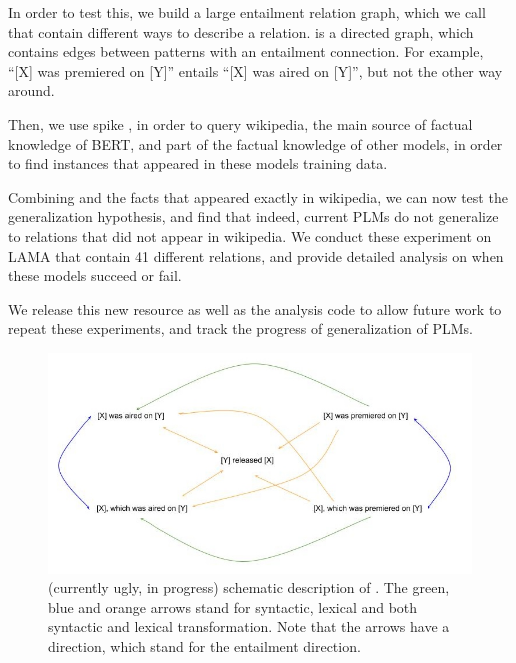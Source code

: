 In order to test this, we build a large entailment relation graph, which we call \resource{} that contain different ways to describe a relation. \resource{} is a directed graph, which contains edges between patterns with an entailment connection. For example, ``[X] was premiered on [Y]'' entails ``[X] was aired on [Y]'', but not the other way around.

Then, we use spike \cite{spike}, in order to query wikipedia, the main source of factual knowledge of BERT, and part of the factual knowledge of other models, in order to find instances that appeared in these models training data.

Combining \resource{} and the facts that appeared exactly in wikipedia, we can now test the generalization hypothesis, and find that indeed, current PLMs do not generalize to relations that did not appear in wikipedia.
We conduct these experiment on LAMA \cite{lama} that contain 41 different relations, and provide detailed analysis on when these models succeed or fail.

We release this new resource as well as the analysis code to allow future work to repeat these experiments, and track the progress of generalization of PLMs.

\begin{figure}[t!]
\centering

\includegraphics[width=1.\columnwidth]{figures/memorization-entailment-graph-croped}

\caption{(currently ugly, in progress) schematic description of \resource{}. The green, blue and orange arrows stand for syntactic, lexical and both syntactic and lexical transformation. Note that the arrows have a direction, which stand for the entailment direction.}
\label{fig:graph}
\end{figure}
